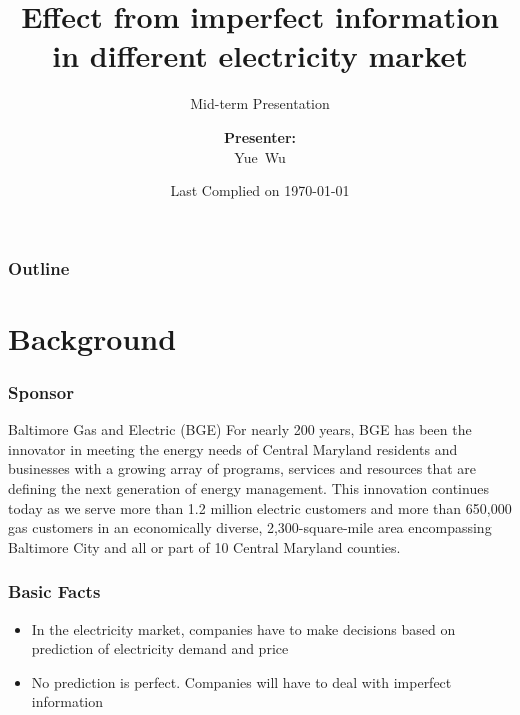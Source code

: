 \documentclass[compress,handout,10pt]{beamer}
\title{{\color{blue} \LARGE Effect from imperfect information in different electricity market\newline} }
\subtitle{{\color{red} \large Mid-term Presentation} }
\author{ 
    {\bf{Presenter:}} \\ 
Yue~Wu \\ 
    \vspace{5pt}
}
\institute{JHU AMS 2012 FALL}
\date{\mygreen Last Complied on \today}
\let\olditem\item
\renewcommand{\item}{\setlength{\itemsep}{0.5\baselineskip}\olditem}
\begin{document}
\begin{frame}[plain]
    \titlepage
\end{frame}

\begin{frame}
    \frametitle{Outline}
    \tableofcontents
\end{frame}

\section{Background}

\begin{frame}
    \frametitle{Sponsor}
   
    \vspace{7pt}
Baltimore Gas and Electric (BGE)
For nearly 200 years, BGE has been the innovator in meeting the energy needs of Central Maryland residents and businesses with a growing array of programs, services and resources that are defining the next generation of energy management.  This innovation continues today as we serve more than 1.2 million electric customers and more than 650,000 gas customers in an economically diverse, 2,300-square-mile area encompassing Baltimore City and all or part of 10 Central Maryland counties.
 
\end{frame}

\begin{frame}
    \frametitle{Basic Facts}
   
    \vspace{7pt}


             \begin{itemize}
                 \item In the electricity market, companies have to make decisions based on prediction of electricity demand and price
                 \item No prediction is perfect. Companies will have to deal with imperfect information
                
             \end{itemize}


\end{frame}
\end{document}
